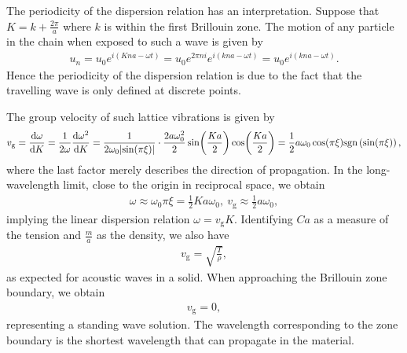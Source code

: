 The periodicity of the dispersion relation has an interpretation. Suppose that $K = k + \frac{2\pi}{a}$ where $k$ is within the first Brillouin zone. The motion of any particle in the chain when exposed to such a wave is given by
\begin{align*}
	u_{n} = u_{0}e^{i(Kna - \omega t)} = u_{0}e^{2\pi ni}e^{i\left(kna - \omega t\right)} = u_{0}e^{i\left(kna - \omega t\right)}.
\end{align*}
Hence the periodicity of the dispersion relation is due to the fact that the travelling wave is only defined at discrete points.

The group velocity of such lattice vibrations is given by
\begin{align*}
	v_{\text{g}} = \dv{\omega}{K} = \frac{1}{2\omega}\dv{\omega^{2}}{K} = \frac{1}{2\omega_{0}\abs{\sin(\pi\xi)}}\cdot \frac{2a\omega_{0}^{2}}{2}\sin(\frac{Ka}{2})\cos(\frac{Ka}{2}) = \frac{1}{2}a\omega_{0}\cos(\pi\xi)\text{sgn}\left(\sin(\pi\xi)\right),
\end{align*}
where the last factor merely describes the direction of propagation. In the long-wavelength limit, close to the origin in reciprocal space, we obtain
\begin{align*}
	\omega \approx \omega_{0}\pi\xi = \frac{1}{2}Ka\omega_{0},\ v_{\text{g}} \approx \frac{1}{2}a\omega_{0},
\end{align*}
implying the linear dispersion relation $\omega = v_{\text{g}}K$. Identifying $Ca$ as a measure of the tension and $\frac{m}{a}$ as the density, we also have
\begin{align*}
	v_{\text{g}} = \sqrt{\frac{T}{\rho}},
\end{align*}
as expected for acoustic waves in a solid. When approaching the Brillouin zone boundary, we obtain
\begin{align*}
	v_{\text{g}} = 0,
\end{align*}
representing a standing wave solution. The wavelength corresponding to the zone boundary is the shortest wavelength that can propagate in the material.


